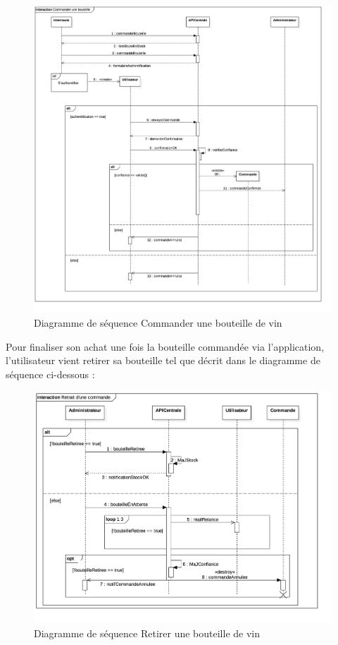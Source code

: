\documentclass[a4paper, titlepage]{report}
\begin{document}
\begin{figure}[!h]
\centering
\includegraphics{Images/SequenceDiagramCommanderBouteille.jpg}
\caption{Diagramme de séquence Commander une bouteille de vin}
\end{figure}

\clearpage
Pour finaliser son achat une fois la bouteille commandée via
l'application, l'utilisateur vient retirer sa bouteille tel que décrit
dans le diagramme de séquence ci-dessous :

\begin{figure}[!h]
\centering
\includegraphics{Images/SequenceDiagramRetirerBouteille.jpg}
\caption{Diagramme de séquence Retirer une bouteille de vin}
\end{figure}
\end{document}
